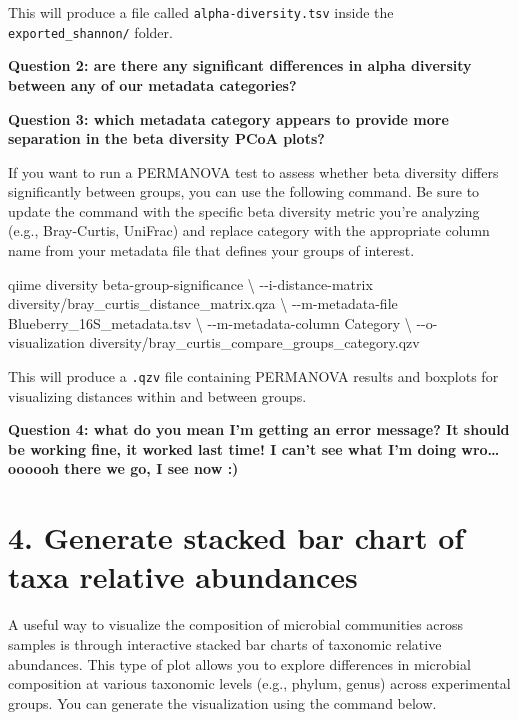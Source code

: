 \documentclass[
]{book}
\newenvironment{Shaded}{\begin{snugshade}}{\end{snugshade}}
\newcommand{\AttributeTok}[1]{\textcolor[rgb]{0.13,0.29,0.53}{#1}}
\newcommand{\DataTypeTok}[1]{\textcolor[rgb]{0.13,0.29,0.53}{#1}}
\newcommand{\ExtensionTok}[1]{#1}
\newcommand{\NormalTok}[1]{#1}
\begin{document}
This will produce a file called \texttt{alpha-diversity.tsv} inside the \texttt{exported\_shannon/} folder.

\textbf{Question 2: are there any significant differences in alpha diversity between any of our metadata categories?}

\textbf{Question 3: which metadata category appears to provide more separation in the beta diversity PCoA plots?}

If you want to run a PERMANOVA test to assess whether beta diversity differs significantly between groups, you can use the following command. Be sure to update the command with the specific beta diversity metric you're analyzing (e.g., Bray-Curtis, UniFrac) and replace category with the appropriate column name from your metadata file that defines your groups of interest.

\begin{Shaded}
\begin{Highlighting}[]
\ExtensionTok{qiime}\NormalTok{ diversity beta{-}group{-}significance }\DataTypeTok{\textbackslash{}}
  \AttributeTok{{-}{-}i{-}distance{-}matrix}\NormalTok{ diversity/bray\_curtis\_distance\_matrix.qza }\DataTypeTok{\textbackslash{}}
  \AttributeTok{{-}{-}m{-}metadata{-}file}\NormalTok{ Blueberry\_16S\_metadata.tsv }\DataTypeTok{\textbackslash{}}
  \AttributeTok{{-}{-}m{-}metadata{-}column}\NormalTok{ Category }\DataTypeTok{\textbackslash{}}
  \AttributeTok{{-}{-}o{-}visualization}\NormalTok{ diversity/bray\_curtis\_compare\_groups\_category.qzv}
\end{Highlighting}
\end{Shaded}

This will produce a \texttt{.qzv} file containing PERMANOVA results and boxplots for visualizing distances within and between groups.

\textbf{Question 4: what do you mean I'm getting an error message? It should be working fine, it worked last time! I can't see what I'm doing wro\ldots{} oooooh there we go, I see now :)}

\section{4. Generate stacked bar chart of taxa relative abundances}\label{stacked-bar-chart}

A useful way to visualize the composition of microbial communities across samples is through interactive stacked bar charts of taxonomic relative abundances. This type of plot allows you to explore differences in microbial composition at various taxonomic levels (e.g., phylum, genus) across experimental groups. You can generate the visualization using the command below.
\end{document}
